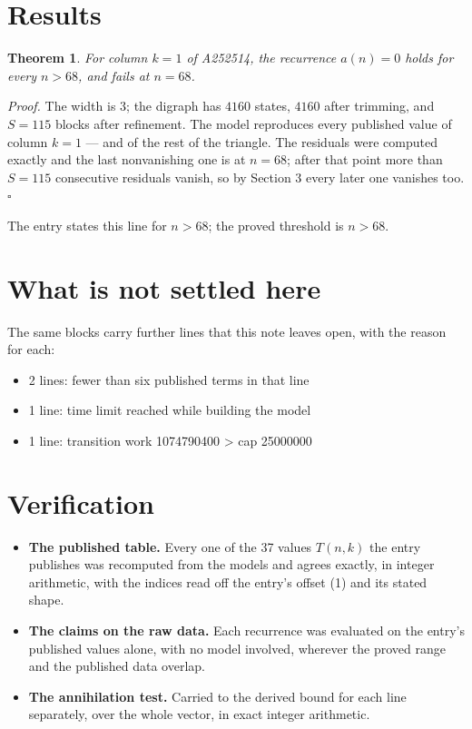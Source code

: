 \documentclass[11pt]{article}
\newtheorem{theorem}{Theorem}
\theoremstyle{definition}
\begin{document}
\section{Results}

\begin{theorem} For column $k = 1$ of A252514, the recurrence $a(n) = 0$ holds for every $n > 68$, and fails at $n = 68$.\end{theorem}

{\itshape Proof.} The width is $3$; the digraph has $4160$ states, $4160$ after trimming, and $S = 115$ blocks after refinement. The model reproduces every published value of column $k = 1$ --- and of the rest of the triangle. The residuals were computed exactly and the last nonvanishing one is at $n = 68$; after that point more than $S = 115$ consecutive residuals vanish, so by Section 3 every later one vanishes too. $\square$

The entry states this line for $n > 68$; the proved threshold is $n > 68$.

\section{What is not settled here}

The same blocks carry further lines that this note leaves open, with the reason for each:

\begin{itemize}

\item 2 lines: fewer than six published terms in that line

\item 1 line: time limit reached while building the model

\item 1 line: transition work 1074790400 > cap 25000000

\end{itemize}

\section{Verification}

\begin{itemize}

\item {\bfseries The published table.} Every one of the 37 values $T(n,k)$ the entry publishes was recomputed from the models and agrees exactly, in integer arithmetic, with the indices read off the entry's offset (1) and its stated shape.

\item {\bfseries The claims on the raw data.} Each recurrence was evaluated on the entry's published values alone, with no model involved, wherever the proved range and the published data overlap.

\item {\bfseries The annihilation test.} Carried to the derived bound for each line separately, over the whole vector, in exact integer arithmetic.

\end{itemize}
\end{document}
